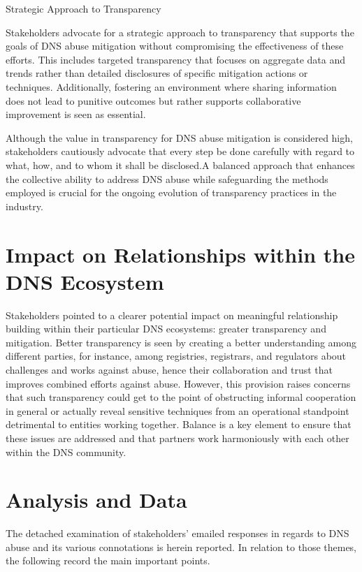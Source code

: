 Strategic Approach to Transparency

Stakeholders advocate for a strategic approach to transparency that supports the goals of DNS abuse mitigation without compromising the effectiveness of these efforts. This includes targeted transparency that focuses on aggregate data and trends rather than detailed disclosures of specific mitigation actions or techniques. Additionally, fostering an environment where sharing information does not lead to punitive outcomes but rather supports collaborative improvement is seen as essential.

Although the value in transparency for DNS abuse mitigation is considered high, stakeholders cautiously advocate that every step be done carefully with regard to what, how, and to whom it shall be disclosed.A balanced approach that enhances the collective ability to address DNS abuse while safeguarding the methods employed is crucial for the ongoing evolution of transparency practices in the industry.


\section{Impact on Relationships within the DNS Ecosystem} 

 Stakeholders pointed to a clearer potential impact on meaningful relationship building within their particular DNS ecosystems: greater transparency and mitigation. Better transparency is seen by creating a better understanding among different parties, for instance, among registries, registrars, and regulators about challenges and works against abuse, hence their collaboration and trust that improves combined efforts against abuse. However, this provision raises concerns that such transparency could get to the point of obstructing informal cooperation in general or actually reveal sensitive techniques from an operational standpoint detrimental to entities working together. Balance is a key element to ensure that these issues are addressed and that partners work harmoniously with each other within the DNS community.

\section{Analysis and Data } 

The detached examination of stakeholders' emailed responses in regards to DNS abuse and its various connotations is herein reported. In relation to those themes, the following record the main important points.


